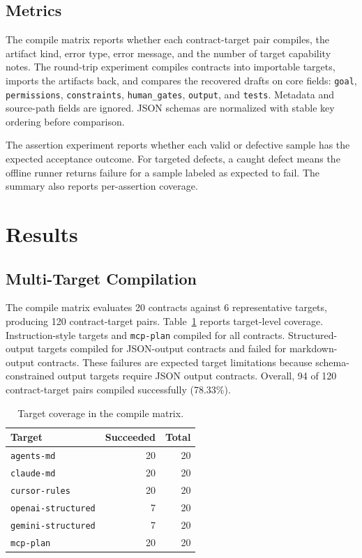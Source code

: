 \documentclass[11pt]{article}
\begin{document}
\subsection{Metrics}

The compile matrix reports whether each contract-target pair compiles, the artifact
kind, error type, error message, and the number of target capability notes. The
round-trip experiment compiles contracts into importable targets, imports the
artifacts back, and compares the recovered drafts on core fields:
\texttt{goal}, \texttt{permissions}, \texttt{constraints},
\texttt{human\_gates}, \texttt{output}, and \texttt{tests}. Metadata and source-path
fields are ignored. JSON schemas are normalized with stable key ordering before
comparison.

The assertion experiment reports whether each valid or defective sample has the
expected acceptance outcome. For targeted defects, a caught defect means the
offline runner returns failure for a sample labeled as expected to fail. The summary
also reports per-assertion coverage.

\section{Results}

\subsection{Multi-Target Compilation}

The compile matrix evaluates 20 contracts against 6 representative targets, producing
120 contract-target pairs. Table~\ref{tab:compile} reports target-level coverage.
Instruction-style targets and \texttt{mcp-plan} compiled for all contracts.
Structured-output targets compiled for JSON-output contracts and failed for
markdown-output contracts. These failures are expected target limitations because
schema-constrained output targets require JSON output contracts. Overall, 94 of 120
contract-target pairs compiled successfully (78.33\%).

\begin{table}[htbp]
\caption{Target coverage in the compile matrix.}
\label{tab:compile}
\centering
\begin{tabular}{lrr}
\toprule
Target & Succeeded & Total \\
\midrule
\texttt{agents-md} & 20 & 20 \\
\texttt{claude-md} & 20 & 20 \\
\texttt{cursor-rules} & 20 & 20 \\
\texttt{openai-structured} & 7 & 20 \\
\texttt{gemini-structured} & 7 & 20 \\
\texttt{mcp-plan} & 20 & 20 \\
\bottomrule
\end{tabular}
\end{table}
\end{document}
